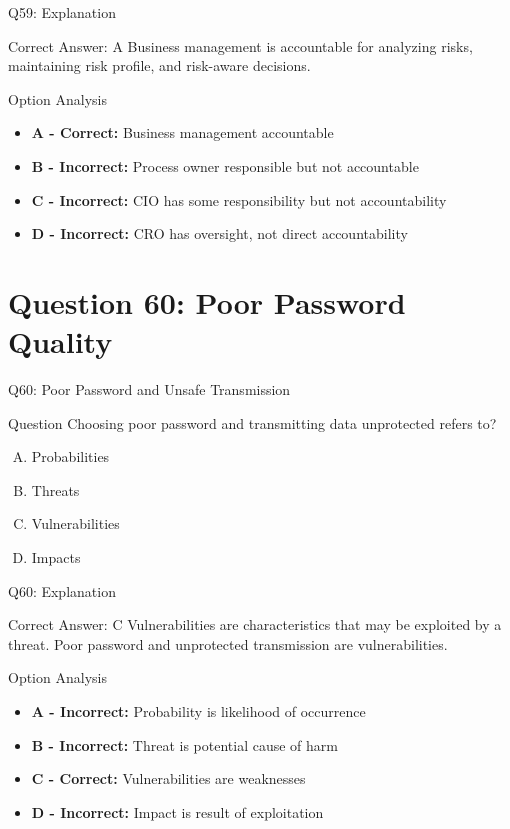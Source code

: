 \documentclass{beamer}
\begin{document}
	\begin{frame}{Q59: Explanation}
		\begin{block}{Correct Answer: A}
			Business management is accountable for analyzing risks, maintaining risk profile, and risk-aware decisions.
		\end{block}
		\begin{block}{Option Analysis}
			\begin{itemize}
				\item \textbf{A - Correct:} Business management accountable
				\item \textbf{B - Incorrect:} Process owner responsible but not accountable
				\item \textbf{C - Incorrect:} CIO has some responsibility but not accountability
				\item \textbf{D - Incorrect:} CRO has oversight, not direct accountability
			\end{itemize}
		\end{block}
	\end{frame}
	
	\section{Question 60: Poor Password Quality}
	
	\begin{frame}{Q60: Poor Password and Unsafe Transmission}
		\begin{block}{Question}
			Choosing poor password and transmitting data unprotected refers to?
		\end{block}
		\begin{enumerate}[(A)]
			\item Probabilities
			\item Threats
			\item Vulnerabilities
			\item Impacts
		\end{enumerate}
	\end{frame}
	
	\begin{frame}{Q60: Explanation}
		\begin{block}{Correct Answer: C}
			Vulnerabilities are characteristics that may be exploited by a threat. Poor password and unprotected transmission are vulnerabilities.
		\end{block}
		\begin{block}{Option Analysis}
			\begin{itemize}
				\item \textbf{A - Incorrect:} Probability is likelihood of occurrence
				\item \textbf{B - Incorrect:} Threat is potential cause of harm
				\item \textbf{C - Correct:} Vulnerabilities are weaknesses
				\item \textbf{D - Incorrect:} Impact is result of exploitation
			\end{itemize}
		\end{block}
	\end{frame}
	
\end{document}
